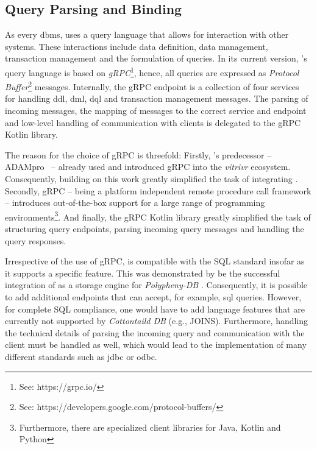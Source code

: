 \subsection{Query Parsing and Binding}
As every \acrshort{dbms}, \cottontail{} uses a query language that allows for interaction with other systems. These interactions include data definition, data management, transaction management and the formulation of queries. In its current version, \cottontail{}'s query language is based on \emph{gRPC}\footnote{See: https://grpc.io/}, hence, all queries are expressed as \emph{Protocol Buffer}\footnote{See: https://developers.google.com/protocol-buffers/} messages. Internally, the gRPC endpoint is a collection of four services for handling \acrshort{ddl}, \acrshort{dml}, \acrshort{dql} and transaction management messages. The parsing of incoming messages, the mapping of messages to the correct service and endpoint and low-level handling of communication with clients is delegated to the gRPC Kotlin library. 

The reason for the choice of gRPC is threefold: Firstly, \cottontail{}'s predecessor -- ADAMpro~\cite{Giangreco:2016Adam} -- already used and introduced gRPC into the \emph{vitrivr} ecosystem. Consequently, building on this work greatly simplified the task of integrating \cottontail{}. Secondly, gRPC -- being a platform independent remote procedure call framework -- introduces out-of-the-box support for a large range of programming environments\footnote{Furthermore, there are specialized client libraries for Java, Kotlin and Python}. And finally, the gRPC Kotlin library greatly simplified the task of structuring query endpoints, parsing incoming query messages and handling the query responses.

Irrespective of the use of gRPC, \cottontail{} is compatible with the SQL standard insofar as it supports a specific feature. This was demonstrated by be the successful integration of \cottontail{} as a storage engine for \emph{Polypheny-DB} . Consequently, it is possible to add additional endpoints that can accept, for example, \acrshort{sql} queries. However, for complete SQL compliance, one would have to add language features that are currently not supported by \emph{Cottontaild DB} (e.g., JOINS). Furthermore, handling the technical details of parsing the incoming query and communication with the client must be handled as well, which would lead to the implementation of many different standards such as \acrshort{jdbc} or \acrshort{odbc}.

